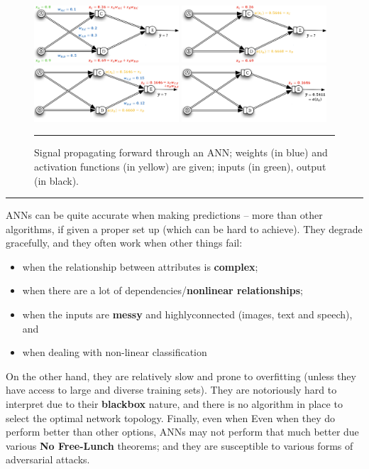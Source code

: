 \begin{figure}[!t]
\centering
\includegraphics[width=0.48\textwidth]{images/DSML/AIDL5.png} \includegraphics[width=0.48\textwidth]{images/DSML/AIDL6.png}
\includegraphics[width=0.48\textwidth]{images/DSML/AIDL7.png} \includegraphics[width=0.48\textwidth]{images/DSML/AIDL8.png}
\caption[\small Feed forward network]{\small Signal propagating forward through an ANN; weights (in blue) and activation functions (in yellow) are given; inputs (in green), output (in black). }\hrule\label{fig:aidlprop}
\end{figure}
\afterpage{\FloatBarrier}
\begin{center}\rule{0.5\linewidth}{.4pt}\end{center}
ANNs can be quite accurate when making predictions -- more than other algorithms, if given a proper set up (which can be hard to achieve). They degrade gracefully, and they often work when other things fail:
\begin{itemize}[noitemsep]
\item when the relationship between attributes is \textbf{complex};
\item when there are a lot of dependencies/\textbf{nonlinear relationships};
\item when the inputs are \textbf{messy} and highlyconnected (images, text and speech), and
\item when dealing with non-linear classification
\end{itemize}
On the other hand, they are relatively slow and prone to overfitting (unless they have access to  large and diverse training sets). They are notoriously hard to interpret due to their \textbf{blackbox} nature, and there is no algorithm in place to select the optimal network topology. Finally, even when Even when they do perform better than other options, ANNs may not perform that much better due various \textbf{No Free-Lunch} theorems; and they are susceptible to various forms of adversarial attacks.
